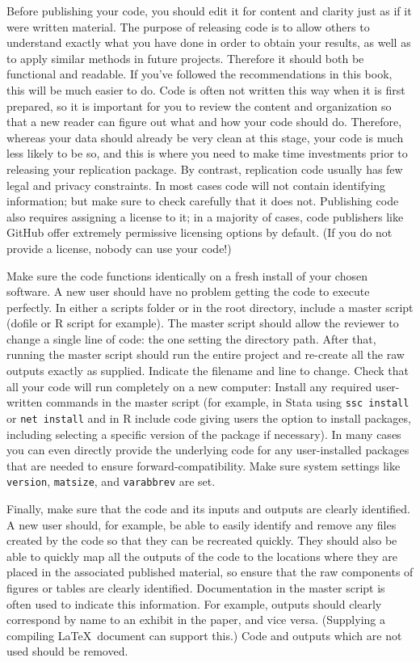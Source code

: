 Before publishing your code, you should edit it for content and clarity
just as if it were written material.
The purpose of releasing code is to allow others to understand
exactly what you have done in order to obtain your results,
as well as to apply similar methods in future projects.
Therefore it should both be functional and readable.
If you've followed the recommendations in this book,
this will be much easier to do.
Code is often not written this way when it is first prepared,
so it is important for you to review the content and organization
so that a new reader can figure out what and how your code should do.
Therefore, whereas your data should already be very clean at this stage,
your code is much less likely to be so, and this is where you need to make
time investments prior to releasing your replication package.
By contrast, replication code usually has few legal and privacy constraints.
In most cases code will not contain identifying information;
but make sure to check carefully that it does not.
Publishing code also requires assigning a license to it;
in a majority of cases, code publishers like GitHub
offer extremely permissive licensing options by default.
(If you do not provide a license, nobody can use your code!)

Make sure the code functions identically on a fresh install of your chosen software.
A new user should have no problem getting the code to execute perfectly.
In either a scripts folder or in the root directory,
include a master script (dofile or R script for example).
The master script should allow the reviewer
to change a single line of code: the one setting the directory path.
After that, running the master script should run the entire project
and re-create all the raw outputs exactly as supplied.
Indicate the filename and line to change.
Check that all your code will run completely on a new computer:
Install any required user-written commands in the master script
(for example, in Stata using \texttt{ssc install} or \texttt{net install}
and in R include code giving users the option to install packages,
including selecting a specific version of the package if necessary).
In many cases you can even directly provide the underlying code
for any user-installed packages that are needed to ensure forward-compatibility.
Make sure system settings like \texttt{version}, \texttt{matsize}, and \texttt{varabbrev} are set.

Finally, make sure that the code and its inputs and outputs are clearly identified.
A new user should, for example, be able to easily identify and remove
any files created by the code so that they can be recreated quickly.
They should also be able to quickly map all the outputs of the code
to the locations where they are placed in the associated published material,
so ensure that the raw components of figures or tables are clearly identified.
Documentation in the master script is often used to indicate this information.
For example, outputs should clearly correspond by name to an exhibit in the paper, and vice versa.
(Supplying a compiling \LaTeX\ document can support this.)
Code and outputs which are not used should be removed.

